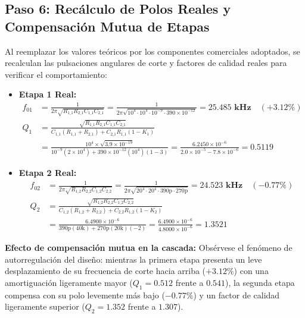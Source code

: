\documentclass[a4paper,11pt]{article}
\begin{document}
\subsection{Paso 6: Recálculo de Polos Reales y Compensación Mutua de Etapas}
Al reemplazar los valores teóricos por los componentes comerciales adoptados, se recalculan las pulsaciones angulares de corte y factores de calidad reales para verificar el comportamiento:
\begin{itemize}
    \item \textbf{Etapa 1 Real:}
    \begin{align}
    f_{01} &= \frac{1}{2\pi \sqrt{R_{1\_1} R_{2\_1} C_{1\_1} C_{2\_1}}} = \frac{1}{2\pi \sqrt{10^4 \cdot 10^4 \cdot 10^{-9} \cdot 390\times 10^{-12}}} = \mathbf{25.485\text{ kHz}} \quad (+3.12\%) \\
    Q_1 &= \frac{\sqrt{R_{1\_1} R_{2\_1} C_{1\_1} C_{2\_1}}}{C_{1\_1}(R_{1\_1} + R_{2\_1}) + C_{2\_1} R_{1\_1} (1 - K_1)} \nonumber \\
        &= \frac{10^4 \times \sqrt{3.9\times 10^{-19}}}{10^{-9}(2\times 10^4) + 390\times 10^{-12}(10^4)(1 - 3)} = \frac{6.2450\times 10^{-6}}{2.0\times 10^{-5} - 7.8\times 10^{-6}} = \mathbf{0.5119}
    \end{align}
    \item \textbf{Etapa 2 Real:}
    \begin{align}
    f_{02} &= \frac{1}{2\pi \sqrt{R_{1\_2} R_{2\_2} C_{1\_2} C_{2\_2}}} = \frac{1}{2\pi \sqrt{20^4 \cdot 20^4 \cdot 390\text{p} \cdot 270\text{p}}} = \mathbf{24.523\text{ kHz}} \quad (-0.77\%) \\
    Q_2 &= \frac{\sqrt{R_{1\_2} R_{2\_2} C_{1\_2} C_{2\_2}}}{C_{1\_2}(R_{1\_2} + R_{2\_2}) + C_{2\_2} R_{1\_2} (1 - K_2)} \nonumber \\
        &= \frac{6.4900\times 10^{-6}}{390\text{p}(40\text{k}) + 270\text{p}(20\text{k})(-2)} = \frac{6.4900\times 10^{-6}}{4.8000\times 10^{-6}} = \mathbf{1.3521}
    \end{align}
\end{itemize}

\noindent\textbf{Efecto de compensación mutua en la cascada:}
Obsérvese el fenómeno de autorregulación del diseño: mientras la primera etapa presenta un leve desplazamiento de su frecuencia de corte hacia arriba ($+3.12\%$) con una amortiguación ligeramente mayor ($Q_1 = 0.512$ frente a $0.541$), la segunda etapa compensa con su polo levemente más bajo ($-0.77\%$) y un factor de calidad ligeramente superior ($Q_2 = 1.352$ frente a $1.307$).
\end{document}
